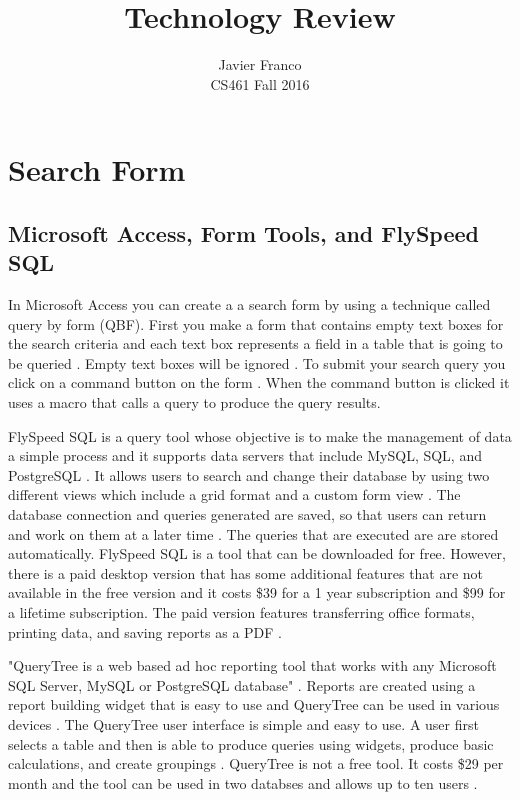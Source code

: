 \documentclass[12pt, draftclsnofoot, onecolumn]{IEEEtran}
\begin{document}
	\title{Technology Review}
	\author{
		Javier Franco \\
		\endgraf
		CS461 Fall 2016
	}
	\maketitle
	
	\pagebreak

\section{Search Form}
\subsection{Microsoft Access, Form Tools, and FlySpeed SQL}
In Microsoft Access you can create a a search form by using a technique called query by form (QBF). First you make a form that contains empty text boxes for the search criteria and each text box represents a field in a table that is going to be queried \cite{Micro}. Empty text boxes will be ignored \cite{Micro}. To submit your search query you click on a command button on the form \cite{Micro}. When the command button is clicked it uses a macro that calls a query to produce the query results. 

FlySpeed SQL is a query tool whose objective is to make the management of data a simple process and it supports data servers that include MySQL, SQL, and PostgreSQL \cite{Andrew}. It allows users to search and change their database by using two different views which include a grid format and a custom form view \cite{Andrew}.  The database connection and queries generated are saved, so that users can return and work on them at a later time \cite{Fly}. The queries that are executed are are stored automatically\cite{Fly}. FlySpeed SQL is a tool that can be downloaded for free. However, there is a paid desktop version that has some additional features that are not available in the free version and it costs \$39 for a 1 year subscription and \$99 for a lifetime subscription. The paid version features transferring office formats, printing data, and saving reports as a PDF \cite{Fly}. 

"QueryTree is a web based ad hoc reporting tool that works with any Microsoft SQL Server, MySQL or PostgreSQL database" \cite{QueryTree}. Reports are created using a report building widget that is easy to use and QueryTree can be used in various devices \cite{QueryTree}. The QueryTree user interface is simple and easy to use. A user first selects a table and then is able to produce queries using widgets, produce basic calculations, and create groupings \cite{QueryTree}. QueryTree is not a free tool. It costs \$29 per month and the tool can be used in two databses and allows up to ten users \cite{QueryTree}. 
\end{document}
